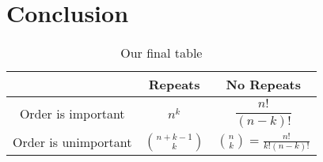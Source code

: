 \documentclass[00_complete]{subfiles}
\begin{document}
\section{Conclusion}

\begin{table}[ht]
\centering
{\renewcommand{\arraystretch}{1.2}%
\begin{tabular}{ccc}
 \hline
& Repeats & No Repeats \\
 \hline
 Order is important & $n^k$ & $\dfrac{n!}{(n-k)!}$ \\
 Order is unimportant & $\displaystyle\binom{n+k-1}{k}$ & $\displaystyle\binom{n}{k}=\frac{n!}{k!(n-k)!}$ \\
 \hline
\end{tabular}}
\caption{Our final table}
\end{table}
\end{document}
